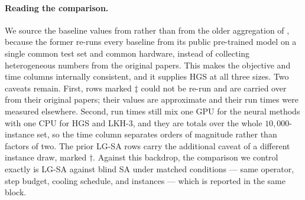 \documentclass[letterpaper]{article} %
\begin{document}
\paragraph{Reading the comparison.}
We source the baseline values from \citet{ma_learning_2023} rather than from the older aggregation of \citet{ma_learning_2021}, because the former re-runs every baseline from its public pre-trained model on a single common test set and common hardware, instead of collecting heterogeneous numbers from the original papers. This makes the objective and time columns internally consistent, and it supplies HGS at all three sizes. Two caveats remain. First, rows marked $\ddagger$ could not be re-run and are carried over from their original papers; their values are approximate and their run times were measured elsewhere. Second, run times still mix one GPU for the neural methods with one CPU for HGS and LKH-3, and they are totals over the whole $10{,}000$-instance set, so the time column separates orders of magnitude rather than factors of two. The prior LG-SA rows \citep{AndrettiEtAl26} carry the additional caveat of a different instance draw, marked $\dagger$. Against this backdrop, the comparison we control exactly is LG-SA against blind SA under matched conditions --- same operator, step budget, cooling schedule, and instances --- which is reported in the same block.
\end{document}
